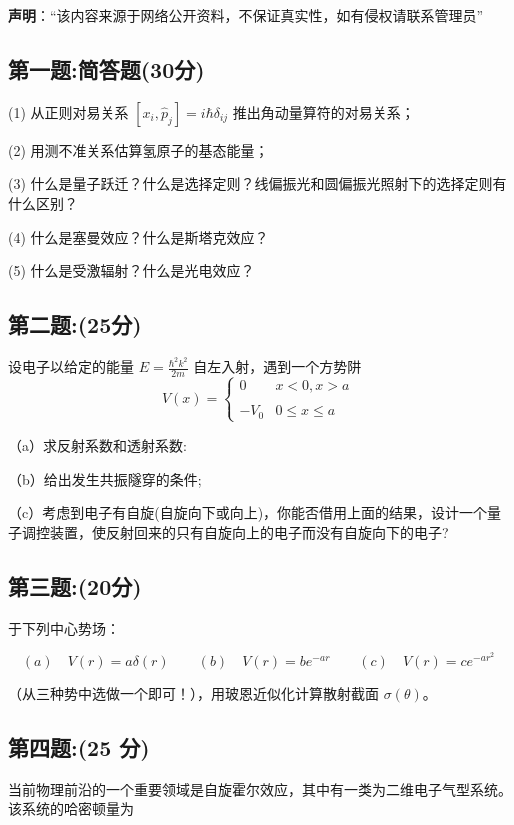 
\textbf{声明}：“该内容来源于网络公开资料，不保证真实性，如有侵权请联系管理员”

\subsection{第一题:简答题(30分)}
(1) 从正则对易关系 $[x_i, \hat{p}_j] = i\hbar \delta_{ij}$ 推出角动量算符的对易关系；

(2) 用测不准关系估算氢原子的基态能量；

(3) 什么是量子跃迁？什么是选择定则？线偏振光和圆偏振光照射下的选择定则有什么区别？

(4) 什么是塞曼效应？什么是斯塔克效应？

(5) 什么是受激辐射？什么是光电效应？

\subsection{第二题:(25分)}
设电子以给定的能量 $E = \frac{\hbar^2 k^2}{2m}$ 自左入射，遇到一个方势阱
\[V(x) = \begin{cases} 0 & x < 0, x > a \\\\- V_0 & 0 \leq x \leq a\end{cases}~\]

（a）求反射系数和透射系数:

（b）给出发生共振隧穿的条件;

（c）考虑到电子有自旋(自旋向下或向上)，你能否借用上面的结果，设计一个量子调控装置，使反射回来的只有自旋向上的电子而没有自旋向下的电子?
\subsection{第三题:(20分)}
于下列中心势场：

\begin{equation}
    (a) \quad V(r) = a \delta (r) \quad \quad (b) \quad V(r) = b e^{-ar} \quad \quad (c) \quad V(r) = c e^{-a r^2}~
\end{equation}

（从三种势中选做一个即可！），用玻恩近似化计算散射截面 $\sigma (\theta)$。

\subsection{第四题:(25 分)}
当前物理前沿的一个重要领域是自旋霍尔效应，其中有一类为二维电子气型系统。该系统的哈密顿量为

